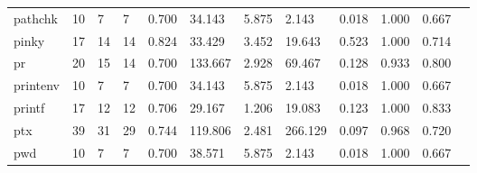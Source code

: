 \begin{longtable}{lp{1.00cm}p{1.00cm}p{1.00cm}p{1.00cm}p{1.00cm}p{1.00cm}p{1.00cm}p{1.00cm}p{1.00cm}p{1.00cm}p{1.00cm}}
pathchk   &                           10 &                  7 &                                 7 &                                      0.700 &                                 34.143 &                                        5.875 &                             2.143 &                                   0.018 &                        1.000 &                                        0.667 \\
pinky     &                           17 &                 14 &                                14 &                                      0.824 &                                 33.429 &                                        3.452 &                            19.643 &                                   0.523 &                        1.000 &                                        0.714 \\
pr        &                           20 &                 15 &                                14 &                                      0.700 &                                133.667 &                                        2.928 &                            69.467 &                                   0.128 &                        0.933 &                                        0.800 \\
printenv  &                           10 &                  7 &                                 7 &                                      0.700 &                                 34.143 &                                        5.875 &                             2.143 &                                   0.018 &                        1.000 &                                        0.667 \\
printf    &                           17 &                 12 &                                12 &                                      0.706 &                                 29.167 &                                        1.206 &                            19.083 &                                   0.123 &                        1.000 &                                        0.833 \\
ptx       &                           39 &                 31 &                                29 &                                      0.744 &                                119.806 &                                        2.481 &                           266.129 &                                   0.097 &                        0.968 &                                        0.720 \\
pwd       &                           10 &                  7 &                                 7 &                                      0.700 &                                 38.571 &                                        5.875 &                             2.143 &                                   0.018 &                        1.000 &                                        0.667 \\

\end{longtable}
